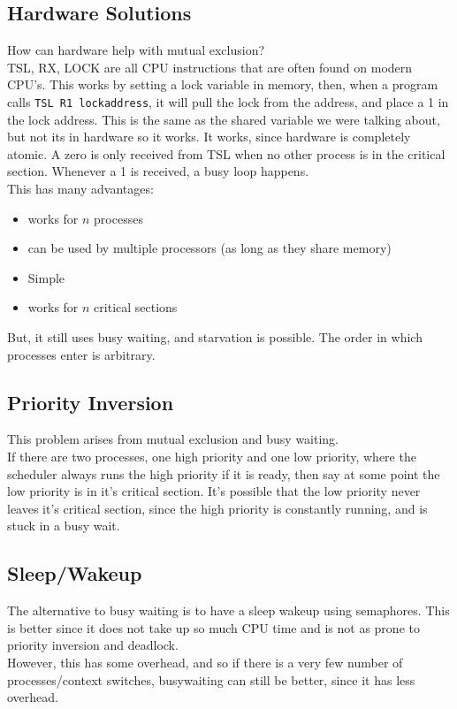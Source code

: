 \documentclass[12pt]{article}
\theoremstyle{definition}
\begin{document}
\subsection{Hardware Solutions}
How can hardware help with mutual exclusion?
\\ \linebreak
TSL, RX, LOCK are all CPU instructions that are often found on modern CPU's. This works by setting a lock variable in memory, then, when a program calls \texttt{TSL R1 lockaddress}, it will pull the lock from the address, and place a 1 in the lock address. This is the same as the shared variable we were talking about, but not its in hardware so it works. It works, since hardware is completely atomic. A zero is only received from TSL when no other process is in the critical section. Whenever a 1 is received, a busy loop happens.
\\ \linebreak
This has many advantages:
\begin{itemize}
	\item works for $n$ processes
	\item can be used by multiple processors (as long as they share memory)
	\item Simple
	\item works for $n$ critical sections
\end{itemize}
But, it still uses busy waiting, and starvation is possible. The order in which processes enter is arbitrary.
\\ \linebreak

\subsection{Priority Inversion}
This problem arises from mutual exclusion and busy waiting. 
\\ \linebreak
If there are two processes, one high priority and one low priority, where the scheduler always runs the high priority if it is ready, then say at some point the low priority is in it's critical section. It's possible that the low priority never leaves it's critical section, since the high priority is constantly running, and is stuck in a busy wait. 

\subsection{Sleep/Wakeup}
The alternative to busy waiting is to have a sleep wakeup using semaphores. This is better since it does not take up so much CPU time and is not as prone to priority inversion and deadlock.
\\ \linebreak
However, this has some overhead, and so if there is a very few number of processes/context switches, busywaiting can still be better, since it has less overhead.
\\ \linebreak
\end{document}
